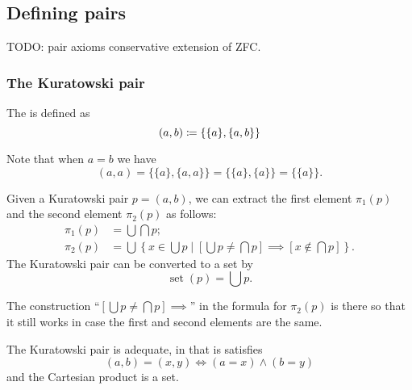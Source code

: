 \subsection{Defining pairs}
TODO: pair axioms conservative extension of ZFC.

\subsubsection{The Kuratowski pair}
\begin{definition}
The  is defined as
\[ (a,b) \coloneqq \{\{a\}, \{a,b\}\} \]
\end{definition}
Note that when $a=b$ we have
\[ (a,a) = \{\{a\},\{a,a\}\} = \{\{a\},\{a\}\} = \{\{a\}\}. \]
\begin{lemma}
Given a Kuratowski pair $p = (a,b)$, we can extract the first element $\pi_1(p)$ and the second element $\pi_2(p)$ as follows:
\begin{align*}
\pi_1(p) &= \bigcup\bigcap p; \\
\pi_2(p) &= \bigcup\left\{ x\in\bigcup p\;|\; \left[\bigcup p \neq \bigcap p\right] \implies \left[ x\notin \bigcap p \right] \right\}.
\end{align*}
The Kuratowski pair can be converted to a set by
\[ \operatorname{set}(p) = \bigcup p. \]
\end{lemma}
The construction ``$\left[\bigcup p \neq \bigcap p\right] \implies$'' in the formula for $\pi_2(p)$ is there so that it still works in case the first and second elements are the same.
\begin{proposition}
The Kuratowski pair is adequate, in that is satisfies
\[ (a,b) = (x,y) \iff (a=x)\land (b=y) \]
and the Cartesian product is a set.
\end{proposition}
